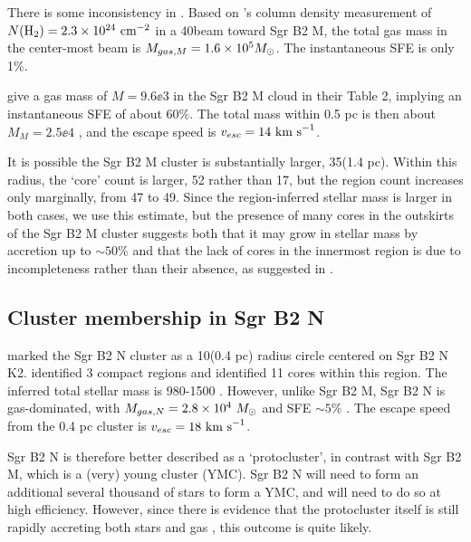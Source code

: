 \documentclass[twocolumn]{aastex61}
\begin{document}
{\color{red} There is some inconsistency in \citet{Schmiedeke2016a}.}
Based on \citet{Schmiedeke2016a}'s column density measurement of $N(\textrm{H}_{2})=2.3\times10^{24}~\textrm{cm}^{-2}$
in a 40\arcsec beam toward Sgr B2 M, the total gas mass in the center-most beam is
$M_{gas, M} = 1.6\times10^{5} M_{\odot}$.  The instantaneous SFE is only 1\%.

\citet{Schmiedeke2016a} give a gas mass of $M=9.6\ee{3}$ \msun in the Sgr B2 M
cloud in their Table 2, implying an instantaneous SFE of about 60\%.  The total
mass within 0.5 pc is then about $M_M = 2.5\ee{4}$ \msun, and the escape speed
is $v_{esc}=14~\textrm{km~s}^{-1}$.



It is possible the Sgr B2 M cluster is substantially larger, 35\arcsec (1.4 pc).
Within this radius, the `core' count is larger, 52 rather than 17, but the \hii
region count increases only marginally, from 47 to 49.  Since the \hii region-inferred
stellar mass is larger in both cases, we use this estimate, but the presence
of many cores in the outskirts of the Sgr B2 M cluster suggests both that it may
grow in stellar mass by accretion up to $\sim50\%$ and that the lack of cores in the
innermost region is due to incompleteness rather than their absence, as suggested
in \citet{Ginsburg2017c}.

\subsection{Cluster membership in Sgr B2 N}
\citet{Schmiedeke2016a} marked the Sgr B2 N cluster as a 10\arcsec  (0.4 pc) radius circle
centered on Sgr B2 N K2.  \citet{Schmiedeke2016a} identified 3 compact \hii regions
and \citet{Ginsburg2017c} identified 11 cores within this region.  The inferred
total stellar mass is 980-1500 \msun.  However, unlike Sgr B2 M, Sgr B2 N
is gas-dominated, with $M_{gas,N} = 2.8\times10^{4}~M_{\odot}$ and SFE $\sim5\%$ \citep{Schmiedeke2016a}.
The escape speed from the 0.4 pc cluster is $v_{esc} = 18~\textrm{km~s}^{-1}$.

Sgr B2 N is therefore better described as a `protocluster', in contrast with
Sgr B2 M, which is a (very) young cluster (YMC).  Sgr B2 N will need to form an
additional several thousand \msun of stars to form a YMC, and will need to do
so at high efficiency.  However, since there is evidence that the protocluster
itself is still rapidly accreting both stars and gas \citep[][cite myself?]{},
this outcome is quite likely.
\end{document}
